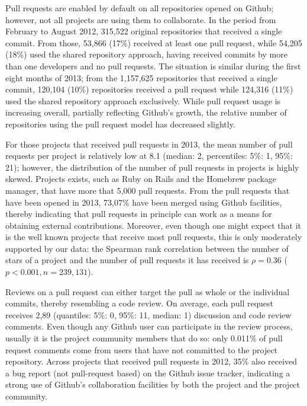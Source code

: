 \documentclass{sig-alternate}
\begin{document}
Pull requests are enabled by default on all repositories opened on Github;
however, not all projects are using them to collaborate.  In the period from
February to August 2012, 315,522 original repositories that received a single
commit. From those, 53,866 (17\%) received at least one pull request, while
54,205 (18\%) used the shared repository approach, having received commits by
more than one developers and no pull requests.  The situation is similar during
the first eight months of 2013; from the 1,157,625 repositories that received a
single commit, 120,104 (10\%) repositories received a pull request while 124,316
(11\%) used the shared repository approach exclusively. While pull request usage
is increasing overall, partially reflecting Github's growth, the relative number
of repositories using the pull request model has decreased slightly.

For those projects that received pull requests in 2013, the mean number of pull
requests per project is relatively low at 8.1 (median: 2, percentiles: 5\%: 1,
95\%: 21); however, the distribution of the number of pull requests in projects
is highly skewed. Projects exists, such as Ruby on Rails and the Homebrew
package manager, that have more that 5,000 pull requests. From the pull requests
that have been opened in 2013, 73,07\% have been merged using Github facilities,
thereby indicating that pull requests in principle can work as a means for
obtaining external contributions. Moreover, even though one might expect that it
is the well known projects that receive most pull requests, this is only
moderately supported by our data: the Spearman rank correlation between the
number of stars of a project and the number of pull requests it has received is
$\rho = 0.36$ ($p < 0.001, n = 239,131$).

Reviews on a pull request can either target the pull as whole or the individual
commits, thereby resembling a code review. On average, each pull request
receives 2,89 (quantiles: 5\%: 0, 95\%: 11, median: 1) discussion and code
review comments.  Even though any Github user can participate in the review
process, usually it is the project community members that do so: only 0.011\% of
pull request comments come from users that have not committed to the project
repository. Across projects that received pull requests in 2012, 35\% also
received a bug report (not pull-request based) on the Github issue tracker,
indicating a strong use of Github's collaboration facilities by both the project
and the project community.
\end{document}
